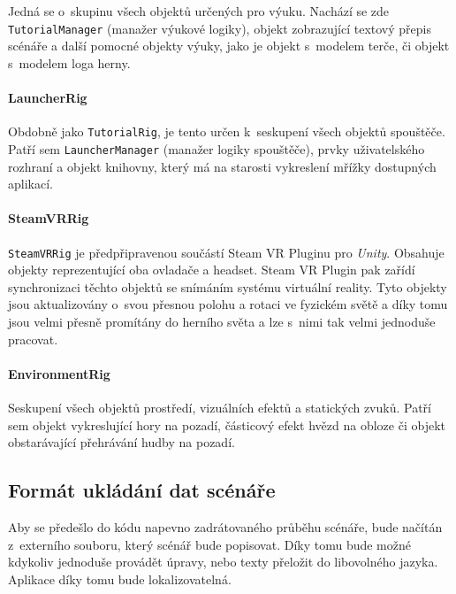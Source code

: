 Jedná se o~skupinu všech objektů určených pro výuku. Nachází se zde
\texttt{TutorialManager} (manažer výukové logiky), objekt zobrazující textový přepis scénáře a
další pomocné objekty výuky, jako je objekt s~modelem terče, či objekt
s~modelem loga herny.

\paragraph{LauncherRig}\label{launcherrig}

Obdobně jako \texttt{TutorialRig}, je tento určen k~seskupení všech
objektů spouštěče. Patří sem \texttt{LauncherManager} (manažer logiky spouštěče), prvky
uživatelského rozhraní a objekt knihovny, který má na starosti
vykreslení mřížky dostupných aplikací.

\paragraph{SteamVRRig}\label{steamvrrig}

\texttt{SteamVRRig} je předpřipravenou součástí Steam VR Pluginu pro
\emph{Unity}. Obsahuje objekty reprezentující oba ovladače a headset.
Steam VR Plugin pak zařídí synchronizaci těchto objektů se snímáním
systému virtuální reality. Tyto objekty jsou aktualizovány o~svou
přesnou polohu a rotaci ve fyzickém světě a díky tomu jsou velmi přesně
promítány do herního světa a lze s~nimi tak velmi jednoduše pracovat.

\paragraph{EnvironmentRig}\label{environmentrig}

Seskupení všech objektů prostředí, vizuálních efektů a
statických zvuků. Patří sem objekt vykreslující hory na pozadí,
částicový efekt hvězd na obloze či objekt obstarávající přehrávání hudby
na pozadí.

\subsection{Formát ukládání dat
scénáře}\label{formuxe1t-ukluxe1duxe1nuxed-dat-scuxe9nuxe1ux159e}

Aby se předešlo do kódu napevno zadrátovaného průběhu scénáře, bude
načítán z~externího souboru, který scénář bude popisovat. Díky tomu bude
možné kdykoliv jednoduše provádět úpravy, nebo texty přeložit do
libovolného jazyka. Aplikace díky tomu bude lokalizovatelná.

